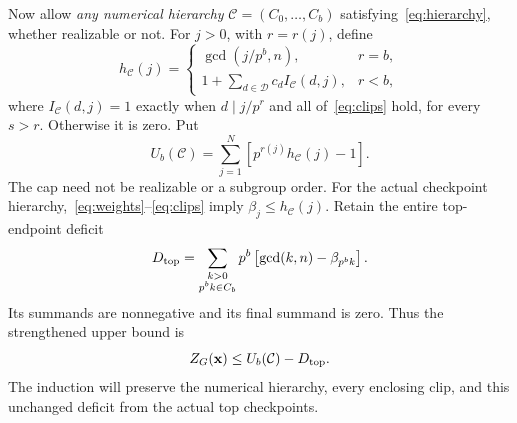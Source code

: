 \documentclass[11pt,letterpaper]{article}
\theoremstyle{definition}\newtheorem{definition}{Definition}
\newcommand{\D}{\mathcal D}
\newcommand{\C}{\mathcal C}
\begin{document}
Now allow \emph{any numerical hierarchy} $\C=(C_0,\ldots,C_b)$ satisfying~\eqref{eq:hierarchy}, whether realizable or not. For $j>0$, with $r=r(j)$, define
\begin{equation}
h_{\C}(j)=
\begin{cases}
\gcd(j/p^b,n),&r=b,\\
1+\displaystyle\sum_{d\in\D}c_d I_{\C}(d,j),&r<b,
\end{cases}\label{eq:cap}
\end{equation}
where $I_{\C}(d,j)=1$ exactly when $d\mid j/p^r$ and all of~\eqref{eq:clips} hold, for every $s>r$. Otherwise it is zero. Put
\begin{equation}
U_b(\C)=\sum_{j=1}^{N}\left[p^{r(j)}h_{\C}(j)-1\right].\label{eq:invariant}
\end{equation}
The cap need not be realizable or a subgroup order. For the actual checkpoint hierarchy,~\eqref{eq:weights}--\eqref{eq:clips} imply $\beta_j\le h_{\C}(j)$. Retain the entire top-endpoint deficit
\begin{equation}
D_{\rm top}=\sum_{\substack{k>0\\p^bk\in C_b}}
 p^b\left[\gcd(k,n)-\beta_{p^bk}\right].\label{eq:deficit}
\end{equation}
Its summands are nonnegative and its final summand is zero. Thus the strengthened upper bound is
\begin{equation}
Z_G(\mathbf{x})\le U_b(\C)-D_{\rm top}.\label{eq:strongcap}
\end{equation}
The induction will preserve the numerical hierarchy, every enclosing clip, and this unchanged deficit from the actual top checkpoints.
\end{document}
